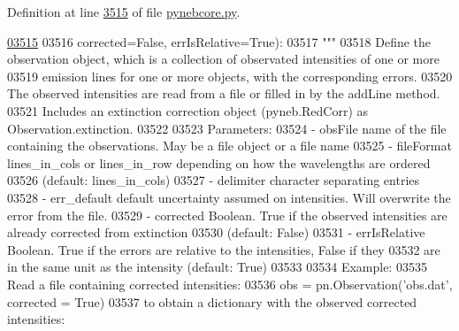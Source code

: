 Definition at line \hyperlink{pynebcore_8py_source_l03515}{3515} of file \hyperlink{pynebcore_8py_source}{pynebcore.\-py}.


\begin{DoxyCode}
\hypertarget{classpyneb_1_1core_1_1pynebcore_1_1_observation_l03515}{}\hyperlink{classpyneb_1_1core_1_1pynebcore_1_1_observation_a4f72b542ac93dd5376e05c7c44015409}{03515} 
03516                  corrected=\textcolor{keyword}{False}, errIsRelative=\textcolor{keyword}{True}):
03517         \textcolor{stringliteral}{"""}
03518 \textcolor{stringliteral}{        Define the observation object, which is a collection of observated intensities of one or more}
03519 \textcolor{stringliteral}{        emission lines for one or more objects, with the corresponding errors.}
03520 \textcolor{stringliteral}{        The observed intensities are read from a file or filled in by the addLine method.}
03521 \textcolor{stringliteral}{        Includes an extinction correction object (pyneb.RedCorr) as Observation.extinction.}
03522 \textcolor{stringliteral}{        }
03523 \textcolor{stringliteral}{        Parameters:}
03524 \textcolor{stringliteral}{            - obsFile       name of the file containing the observations. May be a file object or a file
       name }
03525 \textcolor{stringliteral}{            - fileFormat    lines\_in\_cols or lines\_in\_row depending on how the wavelengths are ordered }
03526 \textcolor{stringliteral}{                                (default: lines\_in\_cols)}
03527 \textcolor{stringliteral}{            - delimiter     character separating entries }
03528 \textcolor{stringliteral}{            - err\_default   default uncertainty assumed on intensities. Will overwrite the error from the
       file.}
03529 \textcolor{stringliteral}{            - corrected     Boolean. True if the observed intensities are already corrected from extinction}
03530 \textcolor{stringliteral}{                                (default: False)}
03531 \textcolor{stringliteral}{            - errIsRelative Boolean. True if the errors are relative to the intensities, False if they}
03532 \textcolor{stringliteral}{                                are in the same unit as the intensity (default: True)}
03533 \textcolor{stringliteral}{}
03534 \textcolor{stringliteral}{        Example:}
03535 \textcolor{stringliteral}{            Read a file containing corrected intensities:}
03536 \textcolor{stringliteral}{                obs = pn.Observation('obs.dat', corrected = True)}
03537 \textcolor{stringliteral}{            to obtain a dictionary with the observed  corrected intensities:}

\end{DoxyCode}

